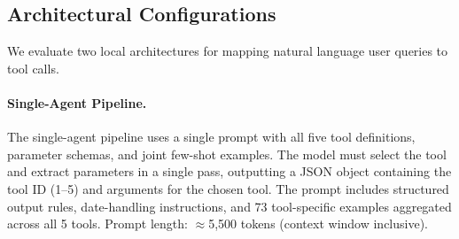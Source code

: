 \documentclass[11pt,twocolumn]{article}
\begin{document}
\begin{table}[t]
\centering
\small
{}
\caption{Tool inventory. The five tools span visualisation (1--3),
aggregation (4), and retrieval (5).}
\label{tab:tools}
\end{table}

\subsection{Architectural Configurations}

We evaluate two local architectures for mapping natural language user
queries to tool calls.

\paragraph{Single-Agent Pipeline.}
The single-agent pipeline uses a single prompt with all five tool
definitions, parameter schemas, and joint few-shot examples.
The model must select the tool and extract parameters in a single
pass, outputting a JSON object containing the tool ID (1--5) and
arguments for the chosen tool.
The prompt includes structured output rules, date-handling
instructions, and 73 tool-specific examples aggregated across all 5
tools.
Prompt length: $\approx$5,500 tokens (context window inclusive).
\end{document}
